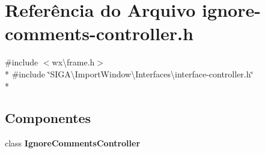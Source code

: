 \section{Referência do Arquivo ignore-\/comments-\/controller.h}
\label{ignore-comments-controller_8h}
{\ttfamily \#include $<$wx\textbackslash{}frame.\+h$>$}\\*
{\ttfamily \#include \char`\"{}S\+I\+G\+A\textbackslash{}\+Import\+Window\textbackslash{}\+Interfaces\textbackslash{}interface-\/controller.\+h\char`\"{}}\\*
\subsection*{Componentes}
\begin{DoxyCompactItemize}
\item 
class {\bf Ignore\+Comments\+Controller}
\end{DoxyCompactItemize}
